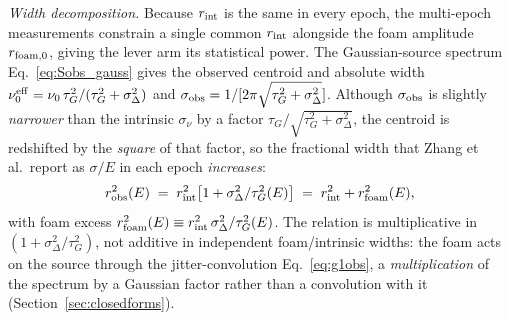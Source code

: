 \documentclass[aps,prd,onecolumn,amsmath,amssymb]{revtex4-2}
\begin{document}
\textit{Width decomposition.}
Because $r_{\rm int}$ is the same in every epoch, the multi-epoch
measurements constrain a single common $r_{\rm int}$ alongside the
foam amplitude $r_{\rm foam,0}$, giving the lever arm its statistical
power.  The Gaussian-source spectrum Eq.~\eqref{eq:Sobs_gauss} gives the
observed centroid and absolute width
$\nu_0^{\rm eff}=\nu_0\,\tau_G^2/(\tau_G^2+\sigma_\Delta^2)$ and
$\sigma_{\rm obs}=1/[2\pi\sqrt{\tau_G^2+\sigma_\Delta^2}]$.  Although
$\sigma_{\rm obs}$ is slightly \emph{narrower} than the intrinsic
$\sigma_\nu$ by a factor $\tau_G/\sqrt{\tau_G^2+\sigma_\Delta^2}$,
the centroid is redshifted by the \emph{square} of that factor, so
the fractional width that Zhang et al.\ report as $\sigma/E$ in each
epoch \emph{increases}:
\begin{equation}
  r_{\rm obs}^2(E) \;=\; r_{\rm int}^2\bigl[1+\sigma_\Delta^2/\tau_G^2(E)\bigr]
                  \;=\; r_{\rm int}^2 + r_{\rm foam}^2(E),
  \label{eq:robs_decomp}
\end{equation}
with foam excess $r_{\rm foam}^2(E)\equiv r_{\rm int}^2\,
\sigma_\Delta^2/\tau_G^2(E)$.  The relation is multiplicative in
$(1+\sigma_\Delta^2/\tau_G^2)$, not additive in independent
foam/intrinsic widths: the foam acts on the source through the
jitter-convolution Eq.~\eqref{eq:g1obs}, a \emph{multiplication} of
the spectrum by a Gaussian factor rather than a convolution with it
(Section~\ref{sec:closedforms}).
\end{document}
